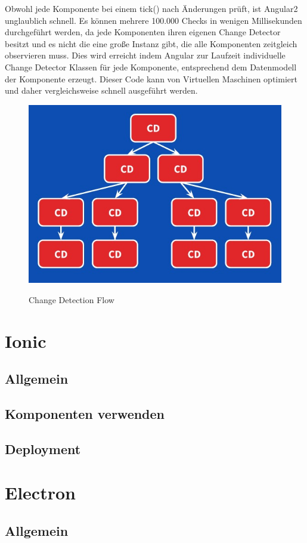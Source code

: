 Obwohl jede Komponente bei einem tick() nach Änderungen prüft, ist Angular2 unglaublich schnell. Es können mehrere 100.000 Checks in wenigen Millisekunden durchgeführt werden,
da jede Komponenten ihren eigenen Change Detector besitzt und es nicht die eine große Instanz gibt, die alle Komponenten zeitgleich observieren muss.
Dies wird erreicht indem Angular zur Laufzeit individuelle Change Detector Klassen für jede Komponente, entsprechend dem Datenmodell der Komponente erzeugt.
Dieser Code kann von Virtuellen Maschinen optimiert und daher vergleichsweise schnell ausgeführt werden.

\vspace{1cm}

\begin{figure}[ht]
 \centering
 \includegraphics[width=0.7\linewidth]{kapitel3/cd-tree.jpg}
 \caption{Change Detection Flow}\cite{changedetection-explained}
\end{figure}


\section{Ionic}
\subsection{Allgemein}
\subsection{Komponenten verwenden}
\subsection{Deployment}

\section{Electron}
\subsection{Allgemein}
